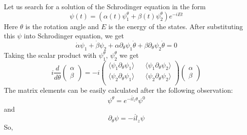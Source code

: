 \documentclass{article}
\begin{document}
Let us search for a solution of the Schrodinger equation in the form
\begin{equation}
    \psi(t) = (\alpha(t)\psi_1^\theta + \beta(t) \psi_2^\theta) e^{-iEt} 
\end{equation}
Here $\theta$ is the rotation angle and $E$ is the energy of the states. After substituting
this $\psi$ into Schrodinger equation, we get
\begin{equation}
    \dot{\alpha} \psi_1 + \dot{\beta} \psi_2 + 
       \alpha \partial_\theta \psi_1\dot{\theta} + 
       \beta  \partial_\theta \psi_2\dot{\theta} = 0
\end{equation}
Taking the scalar product with $\psi_1^\theta$, $\psi_2^\theta$ we get
\begin{equation}
   i\frac{d}{d\theta} 
                          \begin{pmatrix}
                            \alpha \\
                            \beta
                          \end{pmatrix}
                          = -i\begin{pmatrix}
                            \langle \psi_1 \partial_\theta \psi_1 \rangle&&
                            \langle \psi_1 \partial_\theta \psi_2 \rangle\\
                            \langle \psi_2 \partial_\theta \psi_1 \rangle&&
                            \langle \psi_2 \partial_\theta \psi_2 \rangle\\
                          \end{pmatrix}
                          \begin{pmatrix}
                            \alpha \\
                            \beta
                          \end{pmatrix}
\end{equation}
The matrix elements can be easily calculated after the following observation:
\begin{equation}
    \psi^\theta = e^{-i\hat{l}_z \theta}\psi^0
\end{equation}
and
\begin{equation}
    \partial_\theta \psi= -i\hat{l}_z \psi
\end{equation}
So, 
\end{document}
